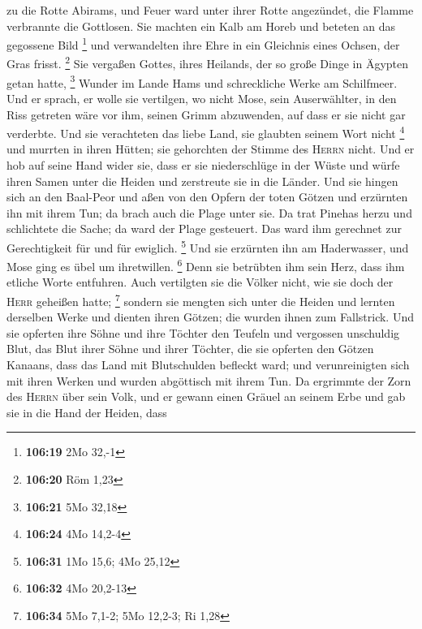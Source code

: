 zu die Rotte Abirams,  und Feuer ward unter ihrer Rotte
angezündet, die Flamme verbrannte die Gottlosen.  Sie
machten ein Kalb am Horeb und beteten an das gegossene Bild \footnote{\textbf{106:19}
  2Mo 32,-1}  und verwandelten ihre Ehre in ein Gleichnis
eines Ochsen, der Gras frisst. \footnote{\textbf{106:20} Röm 1,23}
 Sie vergaßen Gottes, ihres Heilands, der so große Dinge
in Ägypten getan hatte, \footnote{\textbf{106:21} 5Mo 32,18}
 Wunder im Lande Hams und schreckliche Werke am
Schilfmeer.  Und er sprach, er wolle sie vertilgen, wo
nicht Mose, sein Auserwählter, in den Riss getreten wäre vor ihm, seinen
Grimm abzuwenden, auf dass er sie nicht gar verderbte. 
Und sie verachteten das liebe Land, sie glaubten seinem Wort nicht
\footnote{\textbf{106:24} 4Mo 14,2-4}  und murrten in
ihren Hütten; sie gehorchten der Stimme des \textsc{Herrn} nicht.
 Und er hob auf seine Hand wider sie, dass er sie
niederschlüge in der Wüste  und würfe ihren Samen unter
die Heiden und zerstreute sie in die Länder.  Und sie
hingen sich an den Baal-Peor und aßen von den Opfern der toten Götzen
 und erzürnten ihn mit ihrem Tun; da brach auch die Plage
unter sie.  Da trat Pinehas herzu und schlichtete die
Sache; da ward der Plage gesteuert.  Das ward ihm
gerechnet zur Gerechtigkeit für und für ewiglich. \footnote{\textbf{106:31}
  1Mo 15,6; 4Mo 25,12}  Und sie erzürnten ihn am
Haderwasser, und Mose ging es übel um ihretwillen. \footnote{\textbf{106:32}
  4Mo 20,2-13}  Denn sie betrübten ihm sein Herz, dass
ihm etliche Worte entfuhren.  Auch vertilgten sie die
Völker nicht, wie sie doch der \textsc{Herr} geheißen hatte; \footnote{\textbf{106:34}
  5Mo 7,1-2; 5Mo 12,2-3; Ri 1,28}  sondern sie mengten
sich unter die Heiden und lernten derselben Werke  und
dienten ihren Götzen; die wurden ihnen zum Fallstrick. 
Und sie opferten ihre Söhne und ihre Töchter den Teufeln 
und vergossen unschuldig Blut, das Blut ihrer Söhne und ihrer Töchter,
die sie opferten den Götzen Kanaans, dass das Land mit Blutschulden
befleckt ward;  und verunreinigten sich mit ihren Werken
und wurden abgöttisch mit ihrem Tun.  Da ergrimmte der
Zorn des \textsc{Herrn} über sein Volk, und er gewann einen Gräuel an
seinem Erbe  und gab sie in die Hand der Heiden, dass
